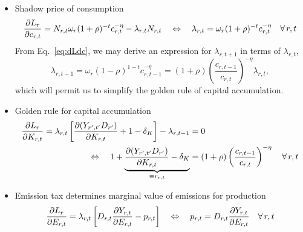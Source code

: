 \documentclass[preprint,3p,authoryear]{elsarticle}
\begin{document}
\begin{itemize}
\item Shadow price of consumption
  \begin{equation}
    \label{eq:dLdc}    \frac{\partial L_r}{\partial c_{r,t}}=N_{r,t}\omega_r(1+\rho)^{-t}c_{r,t}^{-\eta}-\lambda_{r,t}N_{r,t}\quad\Leftrightarrow\quad\lambda_{r,t} = \omega_r(1+\rho)^{-t}c_{r,t}^{-\eta}\quad\forall\,r,t
  \end{equation}
From Eq.~\eqref{eq:dLdc}, we may derive an expression for $\lambda_{r,t+1}$ in terms of $\lambda_{r,t}$,
\begin{equation}
  \label{eq:lambda_tpone} \lambda_{r,t-1}=\omega_r(1-\rho)^{1-t}c_{r,t-1}^{-\eta}=(1+\rho)\left(\frac{c_{r,t-1}}{c_{r,t}}\right)^{-\eta}\lambda_{r,t},
\end{equation}
which will permit us to simplify the golden rule of capital accumulation.
\item Golden rule for capital accumulation
  \begin{align} \frac{\partial L_r}{\partial K_{r,t}}=\lambda_{r,t}\left[\frac{\partial(Y_{r',t'}D_{r'})}{\partial K_{r,t}}+1-\delta_K\right]-\lambda_{r,t-1}&= 0\notag\\
    \Leftrightarrow\quad 1+\underbrace{\frac{\partial(Y_{r',t'}D_{r'})}{\partial K_{r,t}}-\delta_K}_{\equiv r_{r,t}} &= (1+\rho)\left(\frac{c_{r,t-1}}{c_{r,t}}\right)^{-\eta}\quad\forall\, r,t \label{eq:dLdK}
  \end{align}
\item Emission tax determines marginal value of emissions for production  
  \begin{equation}
    \label{eq:dLdE} \frac{\partial L_r}{\partial E_{r,t}}=\lambda_{r,t}\left[D_{r,t}\frac{\partial Y_{r,t}}{\partial E_{r,t}}-p_{r,t}\right]\quad\Leftrightarrow\quad p_{r,t}=D_{r,t}\frac{\partial Y_{r,t}}{\partial E_{r,t}} \quad\forall\,r,t 
  \end{equation}
\end{itemize}
\end{document}
